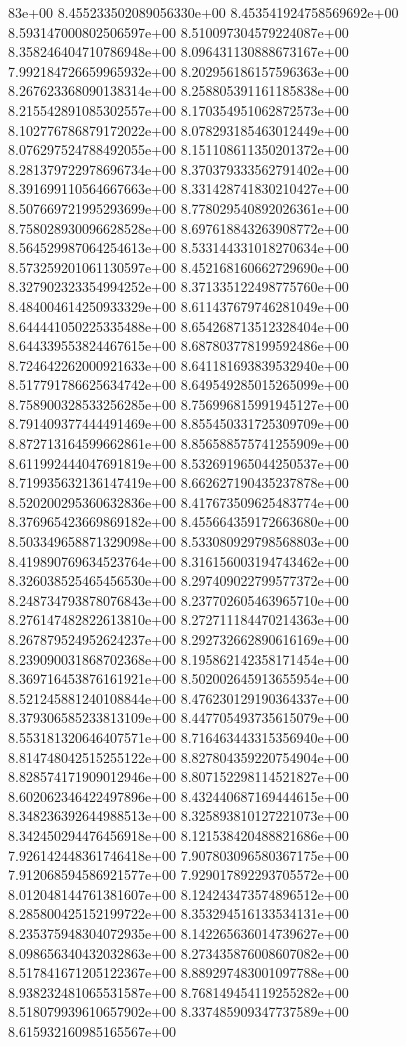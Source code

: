 83e+00	8.455233502089056330e+00	8.453541924758569692e+00	8.593147000802506597e+00	8.510097304579224087e+00	8.358246404710786948e+00	8.096431130888673167e+00	7.992184726659965932e+00	8.202956186157596363e+00	8.267623368090138314e+00	8.258805391161185838e+00	8.215542891085302557e+00	8.170354951062872573e+00	8.102776786879172022e+00	8.078293185463012449e+00	8.076297524788492055e+00	8.151108611350201372e+00	8.281379722978696734e+00	8.370379333562791402e+00	8.391699110564667663e+00	8.331428741830210427e+00	8.507669721995293699e+00	8.778029540892026361e+00	8.758028930096628528e+00	8.697618843263908772e+00	8.564529987064254613e+00	8.533144331018270634e+00	8.573259201061130597e+00	8.452168160662729690e+00	8.327902323354994252e+00	8.371335122498775760e+00	8.484004614250933329e+00	8.611437679746281049e+00	8.644441050225335488e+00	8.654268713512328404e+00	8.644339553824467615e+00	8.687803778199592486e+00	8.724642262000921633e+00	8.641181693839532940e+00	8.517791786625634742e+00	8.649549285015265099e+00	8.758900328533256285e+00	8.756996815991945127e+00	8.791409377444491469e+00	8.855450331725309709e+00	8.872713164599662861e+00	8.856588575741255909e+00	8.611992444047691819e+00	8.532691965044250537e+00	8.719935632136147419e+00	8.662627190435237878e+00	8.520200295360632836e+00	8.417673509625483774e+00	8.376965423669869182e+00	8.455664359172663680e+00	8.503349658871329098e+00	8.533080929798568803e+00	8.419890769634523764e+00	8.316156003194743462e+00	8.326038525465456530e+00	8.297409022799577372e+00	8.248734793878076843e+00	8.237702605463965710e+00	8.276147482822613810e+00	8.272711184470214363e+00	8.267879524952624237e+00	8.292732662890616169e+00	8.239090031868702368e+00	8.195862142358171454e+00	8.369716453876161921e+00	8.502002645913655954e+00	8.521245881240108844e+00	8.476230129190364337e+00	8.379306585233813109e+00	8.447705493735615079e+00	8.553181320646407571e+00	8.716463443315356940e+00	8.814748042515255122e+00	8.827804359220754904e+00	8.828574171909012946e+00	8.807152298114521827e+00	8.602062346422497896e+00	8.432440687169444615e+00	8.348236392644988513e+00	8.325893810127221073e+00	8.342450294476456918e+00	8.121538420488821686e+00	7.926142448361746418e+00	7.907803096580367175e+00	7.912068594586921577e+00	7.929017892293705572e+00	8.012048144761381607e+00	8.124243473574896512e+00	8.285800425152199722e+00	8.353294516133534131e+00	8.235375948304072935e+00	8.142265636014739627e+00	8.098656340432032863e+00	8.273435876008607082e+00	8.517841671205122367e+00	8.889297483001097788e+00	8.938232481065531587e+00	8.768149454119255282e+00	8.518079939610657902e+00	8.337485909347737589e+00	8.615932160985165567e+00
